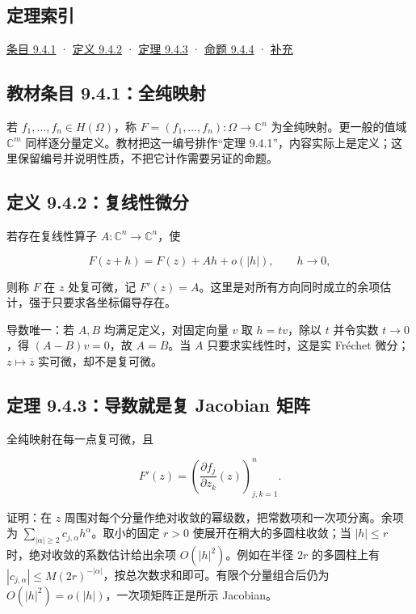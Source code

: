 \documentclass[11pt,a4paper]{article}
\begin{document}
\subsection*{定理索引}\label{ch09-s4-heading-1}

\hyperref[ch09-s4-heading-2]{条目 9.4.1} · \hyperref[ch09-s4-heading-3]{定义 9.4.2} ·
\hyperref[ch09-s4-heading-4]{定理 9.4.3} · \hyperref[ch09-s4-heading-5]{命题 9.4.4} ·
\hyperref[ch09-s4-heading-6]{补充}

\subsection{教材条目 9.4.1：全纯映射}\label{ch09-s4-heading-2}

若 \(f_1,\ldots,f_n\in H(\Omega)\)，称
\(F=(f_1,\ldots,f_n):\Omega\to\mathbb C^n\) 为全纯映射。更一般的值域
\(\mathbb C^m\) 同样逐分量定义。教材把这一编号排作``定理
9.4.1''，内容实际上是定义；这里保留编号并说明性质，不把它计作需要另证的命题。

\subsection{定义 9.4.2：复线性微分}\label{ch09-s4-heading-3}

若存在复线性算子 \(A:\mathbb C^n\to\mathbb C^n\)，使

\[
F(z+h)=F(z)+Ah+o(|h|),\qquad h\to0,
\]

则称 \(F\) 在 \(z\) 处复可微，记
\(F'(z)=A\)。这里是对所有方向同时成立的余项估计，强于只要求各坐标偏导存在。

导数唯一：若 \(A,B\) 均满足定义，对固定向量 \(v\) 取 \(h=tv\)，除以
\(t\) 并令实数 \(t\to0\)，得 \((A-B)v=0\)，故 \(A=B\)。当 \(A\)
只要求实线性时，这是实 Fréchet 微分；\(z\mapsto\overline z\)
实可微，却不是复可微。

\subsection{定理 9.4.3：导数就是复 Jacobian 矩阵}\label{ch09-s4-heading-4}

全纯映射在每一点复可微，且

\[
F'(z)=\left(\frac{\partial f_j}{\partial z_k}(z)\right)_{j,k=1}^n.
\]

证明：在 \(z\)
周围对每个分量作绝对收敛的幂级数，把常数项和一次项分离。余项为
\(\sum_{|\alpha|\ge2}c_{j,\alpha}h^\alpha\)。取小的固定 \(r>0\)
使展开在稍大的多圆柱收敛；当 \(|h|\le r\) 时，绝对收敛的系数估计给出余项
\(O(|h|^2)\)。例如在半径 \(2r\) 的多圆柱上有
\(|c_{j,\alpha}|\le M(2r)^{-|\alpha|}\)，按总次数求和即可。有限个分量组合后仍为
\(O(|h|^2)=o(|h|)\)，一次项矩阵正是所示 Jacobian。
\end{document}
